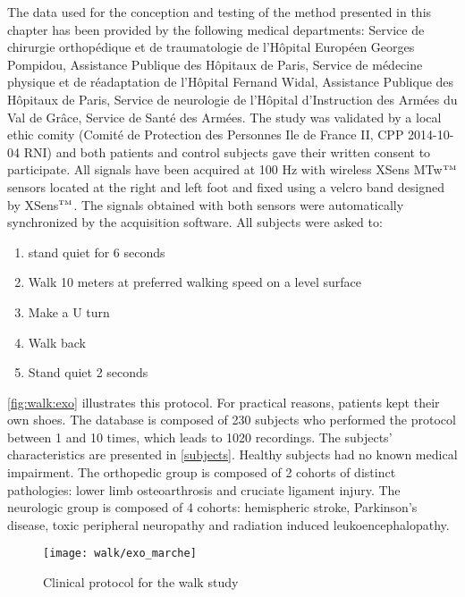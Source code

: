 \documentclass[../thesis.tex]{subfiles}
\begin{document}
The data used for the conception and testing of the method presented in this chapter has been provided by the following medical departments: Service de chirurgie orthopédique et de traumatologie de l'Hôpital Européen Georges Pompidou, Assistance Publique des Hôpitaux de Paris, Service de médecine physique et de réadaptation de l'Hôpital Fernand Widal, Assistance Publique des Hôpitaux de Paris, Service de neurologie de l'Hôpital d’Instruction des Armées du Val de Grâce, Service de Santé des Armées. The study was validated by a local ethic comity (Comité de Protection des Personnes Ile de France II, CPP 2014-10-04 RNI) and both patients and control subjects gave their written consent to participate. All signals have been acquired at 100 Hz with wireless XSens MTw$^{\mbox{\tiny TM}}$ sensors located at the right and left foot and fixed using a velcro band designed by XSens$^{\mbox{\tiny TM}}$. The signals obtained with both sensors were automatically synchronized by the acquisition software. All subjects were asked to:
%
\begin{enumerate}
    \item stand quiet for 6 seconds
    \item Walk 10 meters at preferred walking speed on a level surface
    \item Make a U turn
    \item Walk back
    \item Stand quiet 2 seconds
\end{enumerate}
%
\autoref{fig:walk:exo} illustrates this protocol. For practical reasons, patients kept their own shoes. The database is composed of 230 subjects who performed the protocol between 1 and 10 times, which leads to 1020 recordings.  The subjects' characteristics are presented in \autoref{subjects}. Healthy subjects had no known medical impairment. The orthopedic group is composed of 2 cohorts of distinct pathologies: lower limb osteoarthrosis and cruciate ligament injury. The neurologic group is composed of 4 cohorts: hemispheric stroke, Parkinson’s disease, toxic peripheral neuropathy and radiation induced leukoencephalopathy.


\begin{figure}[tp]
	\centering
	\texttt{[image: walk/exo\_marche]}
	\caption{Clinical protocol for the walk study}
	\label{fig:walk:exo}
\end{figure}
\end{document}
